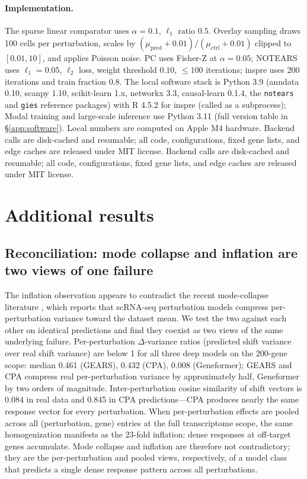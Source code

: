\documentclass{article}
\theoremstyle{plain}
\theoremstyle{definition}
\theoremstyle{remark}
\begin{document}
\paragraph{Implementation.} The sparse linear comparator uses $\alpha=0.1$, $\ell_1$ ratio $0.5$. Overlay sampling draws 100 cells per perturbation, scales by $(\mu_{\text{pred}}+0.01)/(\mu_{\text{ctrl}}+0.01)$ clipped to $[0.01,10]$, and applies Poisson noise. PC uses Fisher-Z at $\alpha=0.05$; NOTEARS uses $\ell_1=0.05$, $\ell_2$ loss, weight threshold $0.10$, $\leq 100$ iterations; inspre uses 200 iterations and train fraction $0.8$. The local software stack is Python 3.9 (anndata 0.10, scanpy 1.10, scikit-learn 1.x, networkx 3.3, causal-learn 0.1.4, the \texttt{notears} and \texttt{gies} reference packages) with R 4.5.2 for inspre (called as a subprocess); Modal training and large-scale inference use Python 3.11 (full version table in \S\ref{app:software}). Local numbers are computed on Apple M4 hardware. Backend calls are disk-cached and resumable; all code, configurations, fixed gene lists, and edge caches are released under MIT license. Backend calls are disk-cached and resumable; all code, configurations, fixed gene lists, and edge caches are released under MIT license.

\section{Additional results}

\subsection{Reconciliation: mode collapse and inflation are two views of one failure}
\label{app:reconciliation}
The inflation observation appears to contradict the recent mode-collapse literature \citep{mejia2025diversity,ahlmanneltze2025}, which reports that scRNA-seq perturbation models compress per-perturbation variance toward the dataset mean. We test the two against each other on identical predictions and find they coexist as two views of the same underlying failure. Per-perturbation $\Delta$-variance ratios (predicted shift variance over real shift variance) are below 1 for all three deep models on the 200-gene scope: median 0.461 (GEARS), 0.432 (CPA), 0.008 (Geneformer); GEARS and CPA compress real per-perturbation variance by approximately half, Geneformer by two orders of magnitude. Inter-perturbation cosine similarity of shift vectors is 0.084 in real data and 0.845 in CPA predictions---CPA produces nearly the same response vector for every perturbation. When per-perturbation effects are pooled across all (perturbation, gene) entries at the full transcriptome scope, the same homogenization manifests as the 23-fold inflation: dense responses at off-target genes accumulate. Mode collapse and inflation are therefore not contradictory; they are the per-perturbation and pooled views, respectively, of a model class that predicts a single dense response pattern across all perturbations.
\end{document}
